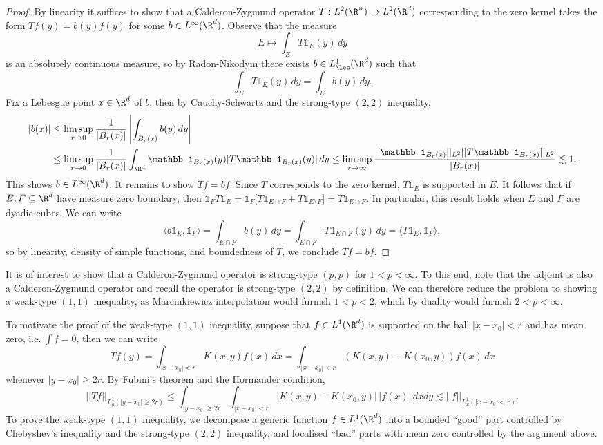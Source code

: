 \documentclass[reqno]{amsart}
\theoremstyle{definition}
\theoremstyle{remark}
\begin{document}
\begin{proof}
	By linearity it suffices to show that a Calderon-Zygmund operator $T: L^2 (\R^n) \to L^2 (\R^d)$ corresponding to the zero kernel takes the form $Tf(y) = b(y) f(y)$ for some $b \in L^\infty (\R^d)$. Observe that the measure 
		\[ E \mapsto \int_E T \mathbb 1_E (y) \, dy \]
	is an absolutely continuous measure, so by Radon-Nikodym	there exists $b \in L^1_{\loc} (\R^d)$ such that 
		\[\int_E T \mathbb 1_E (y) \, dy = \int_E b(y) \, dy. \]
	Fix a Lebesgue point $x \in \R^d$ of $b$, then by Cauchy-Schwartz and the strong-type $(2, 2)$ inequality, 
		\begin{align*}	
			 |b(x)| 
			 	&\leq \limsup_{r \to 0} \frac{1}{|B_r (x)|} \left|\int_{B_r (x)} b(y) \, dy\right|\\
			 	&\leq \limsup_{r \to 0} \frac{1}{|B_r (x)|} \int_{\R^d} \mathbb 1_{B_r (x)} (y) |T \mathbb 1_{B_r (x)} (y)| \, dy \leq \limsup_{r \to \infty} \frac{||\mathbb 1_{B_r (x)}||_{L^2} ||T \mathbb 1_{B_r (x)} ||_{L^2}}{|B_r (x)|} \lesssim 1. 
		\end{align*}	 	
	This shows $b \in L^\infty (\R^d)$. It remains to show $Tf = bf$. Since $T$ corresponds to the zero kernel, $T\mathbb 1_E$ is supported in $E$. It follows that if $E, F \subseteq \R^d$ have measure zero boundary, then $\mathbb 1_F T\mathbb 1_E = \mathbb 1_F \big[T\mathbb 1_{E \cap F}+ T\mathbb 1_{E \setminus F}\big] = T\mathbb 1_{E \cap F}$. In particular, this result holds when $E$ and $F$ are dyadic cubes. We can write
		\[ \langle b \mathbb 1_E, \mathbb 1_F \rangle = \int_{E \cap F} b(y) \, dy = \int_{E \cap F} T \mathbb 1_{E \cap F} (y) \, dy = \langle T\mathbb 1_E, \mathbb 1_F \rangle, \]
	so by linearity, density of simple functions, and boundedness of $T$, we conclude $Tf = bf$. 
\end{proof}

It is of interest to show that a Calderon-Zygmund operator is strong-type $(p, p)$ for $1 < p < \infty$. To this end, note that the adjoint is also a Calderon-Zygmund operator and recall the operator is strong-type $(2, 2)$ by definition. We can therefore reduce the problem to showing a weak-type $(1, 1)$ inequality, as Marcinkiewicz interpolation would furnish $1 < p < 2$, which by duality would furnish $2 < p < \infty$. 

	To motivate the proof of the weak-type $(1, 1)$ inequality, suppose that $f \in L^1 (\R^d)$ is supported on the ball $|x - x_0| < r$ and has mean zero, i.e. $\int f = 0$, then we can write
	\[ Tf(y) = \int_{|x - x_0| < r} K(x, y) f(x) \, dx = \int_{|x - x_0| < r} (K(x, y) - K(x_0, y)) f(x) \, dx  \]
whenever $|y - x_0| \geq 2r$. 	
By Fubini's theorem and the Hormander condition, 
	\[ || T f||_{L^1_y (|y - x_0| \geq 2r)} \leq \int_{|y - x_0| \geq 2r} \int_{|x - x_0| < r} |K(x, y) - K(x_0, y)| \, |f(x)| \, dx dy \lesssim ||f||_{L^1_x (|x - x_0| < r)}. \]
	To prove the weak-type $(1, 1)$ inequality, we decompose a generic function $f \in L^1 (\R^d)$ into a bounded ``good'' part controlled by Chebyshev's inequality and the strong-type $(2, 2)$ inequality, and localised ``bad'' parts with mean zero controlled by the argument above. 
\end{document}
